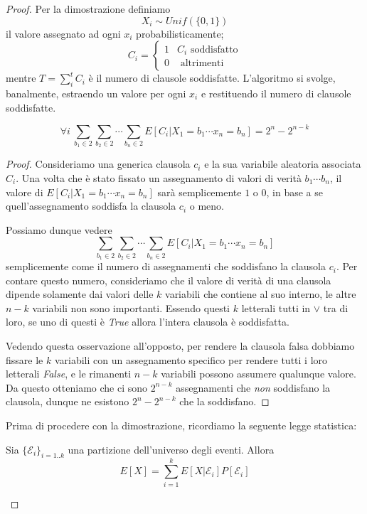 \begin{proof}
	Per la dimostrazione definiamo
	$$
		X_i \sim Unif(\{0,1\})
	$$
	il valore assegnato ad ogni $x_i$ probabilisticamente;
	$$
		C_i =
		\begin{cases}
			1 & C_i \text{ soddisfatto} \\
			0 & \text{ altrimenti}
		\end{cases}
	$$
	mentre $T=\sum_i^t C_i$ è il numero di clausole soddisfatte.
	L'algoritmo si svolge, banalmente, estraendo un valore per ogni $x_i$
	e restituendo il numero di clausole soddisfatte.

	\begin{oss}\label{oss:ciatteso}
		$$
			\forall i ~ \sum_{b_1 \in 2} \sum_{b_2 \in 2} \cdots \sum_{b_n \in 2} E[C_i | X_1=b_1 \cdots x_n=b_n] = 2^n - 2^{n - k}
		$$
	\end{oss}
	\begin{proof}
		Consideriamo una generica clausola $c_i$ e la sua variabile aleatoria
		associata $C_i$. Una volta che è stato fissato un assegnamento di
		valori di verità $b_1 \cdots b_n$, il valore di
		$E[C_i | X_1=b_1 \cdots x_n=b_n]$ sarà semplicemente $1$ o $0$, in base
		a se quell'assegnamento soddisfa la clausola $c_i$ o meno.

		Possiamo dunque vedere
		$$
			\sum_{b_1 \in 2} \sum_{b_2 \in 2} \cdots \sum_{b_n \in 2} E[C_i | X_1=b_1 \cdots x_n=b_n]
		$$
		semplicemente come il numero di assegnamenti che soddisfano la clausola
		$c_i$.
		Per contare questo numero, consideriamo che il valore di verità di una
		clausola dipende solamente dai valori delle $k$ variabili che contiene
		al suo interno, le altre $n-k$ variabili non sono importanti.
		Essendo questi $k$ letterali tutti in $\vee$ tra di loro, se uno di
		questi è \textit{True} allora l'intera clausola è soddisfatta.

		Vedendo questa osservazione all'opposto, per rendere la clausola falsa
		dobbiamo fissare le $k$ variabili con un assegnamento specifico per
		rendere tutti i loro letterali \textit{False}, e le rimanenti $n-k$
		variabili possono assumere qualunque valore. Da questo otteniamo
		che ci sono $2^{n-k}$ assegnamenti che \textit{non} soddisfano la
		clausola, dunque ne esistono $2^n - 2^{n-k}$ che la soddisfano.
	\end{proof}

	Prima di procedere con la dimostrazione, ricordiamo la seguente legge
	statistica:
	\begin{theorem}\label{thm:leggevat}
		Sia $\{\mathcal{E}_i\}_{i=1..k}$ una partizione dell'universo degli eventi.
		Allora
		$$
			E[X] = \sum_{i = 1}^{k} E[X|\mathcal{E}_i]P[\mathcal{E}_i]
		$$
	\end{theorem}


\end{proof}

